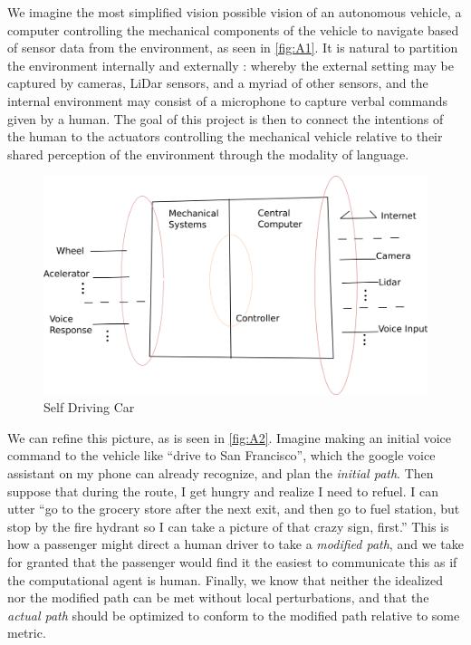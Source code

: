 \documentclass{article}
\begin{document}
We imagine the most simplified vision possible vision of an autonomous
vehicle, a computer controlling the mechanical components of the vehicle to
navigate based of sensor data from the environment, as seen in \autoref{fig:A1}.
It is natural to partition the environment internally and externally : whereby
the external setting may be captured by cameras, LiDar sensors, and a myriad of other
sensors, and the internal environment may consist of a microphone to capture
verbal commands given by a human. The goal of this project is then to connect
the intentions of the human to the actuators controlling the
mechanical vehicle relative to their shared perception of the environment
through the modality of language.

\begin{figure}
\centering
\includegraphics[width=150mm]{pics/selfDriving.png}
\caption{Self Driving Car}\label{fig:A1}
\end{figure}

We can refine this picture, as is seen in \autoref{fig:A2}. Imagine making an
initial voice command to the vehicle like ``drive to San Francisco'', which the
google voice assistant on my phone can already recognize, and plan the
\emph{initial path}. Then suppose that during the route, I get hungry and
realize I need to refuel. I can utter ``go to the grocery store after the next
exit, and then go to fuel station, but stop by the fire hydrant so I can take a
picture of that crazy sign, first.'' This is how a passenger might direct a
human driver to take a \emph{modified path}, and we take for granted that the
passenger would find it the easiest to communicate this as if the computational
agent is human. Finally, we know that neither the idealized nor the modified
path can be met without local perturbations, and that the \emph{actual path}
should be optimized to conform to the modified path relative to some metric.
\end{document}

